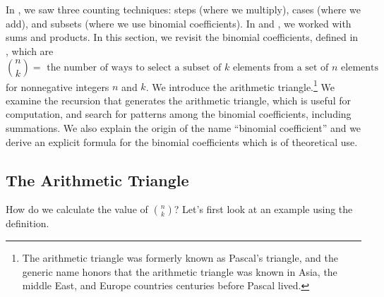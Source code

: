 \section{\secarithtriangle}
\label{sec_arith_triangle}

In , we saw three counting techniques: steps (where we multiply), cases (where we add), and subsets (where we use binomial coefficients).  In  and , we worked with sums and products.  In this section, we revisit the binomial coefficients, defined in , which are 
    $$ \binom{n}{k} = \text{ the number of ways to select a subset of } k \text{ elements from a set of } n \text{ elements}$$ 
for nonnegative integers $n$ and $k$.
We introduce the arithmetic triangle.\footnote{The arithmetic triangle was formerly known as Pascal's triangle, and the generic name honors that the arithmetic triangle was known in Asia, the middle East, and Europe countries centuries before Pascal lived.} We examine the recursion that generates the arithmetic triangle, which is useful for computation, and search for patterns among the binomial coefficients, including summations.  We also explain the origin of the name ``binomial coefficient'' and we derive an explicit formula for the binomial coefficients which is of theoretical use.

\newcommand{\subarithtri}{The Arithmetic Triangle}
\subsection{\subarithtri}
\label{sub_arith_triangle}

How do we calculate the value of $\binom{n}{k}$?  Let's first look at an example using the definition.

